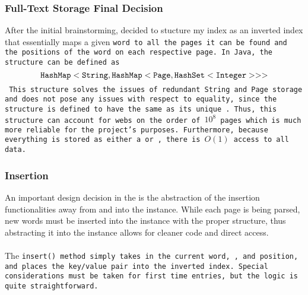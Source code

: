 \documentclass[11pt]{article}
\begin{document}
\subsubsection{Full-Text Storage Final Decision}
After the initial brainstorming, decided to stucture my index as an inverted index that essentially maps a given \tt{word} to all the pages it can be found and the positions of the \tt{word} on each respective page. In Java, the structure can be defined as
\[
\tt{HashMap<String, HashMap<Page, HashSet<Integer>>>}
\]
This structure solves the issues of redundant \tt{String} and Page storage and does not pose any issues with respect to equality, since the \Page{} structure is defined to have the same \hc{} as its unique \URL. Thus, this structure can account for webs on the order of $10^8$ pages which is much more reliable for the project's purposes. Furthermore, because everything is stored as either a \hse{}  or \hm{}, there is $O(1)$ access to all data. 
\subsubsection{Insertion}
An important design decision in the \WI{} is the abstraction of the insertion functionalities away from \CMH{} and into the \WI{} instance. While each page is being parsed, new words must be inserted into the \WI{} instance with the proper structure, thus abstracting it into the \WI{} instance allows for cleaner code and direct access.\\ \\
The \tt{insert()} method simply takes in the current \tt{word}, \Page{}, and position, and places the key/value pair into the inverted index. Special considerations must be taken for first time entries, but the logic is quite straightforward.
\end{document}
